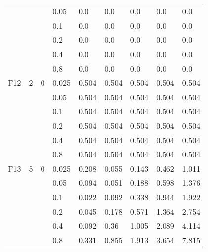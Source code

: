 \begin{longtable}{|l|l|l|l|l|l|l|l|l|}
\cmidrule{4-9} &     &          & 0.05           & 0.0        & 0.0        & 0.0        & 0.0        & 0.0        \\
\cmidrule{4-9} &     &          & 0.1            & 0.0        & 0.0        & 0.0        & 0.0        & 0.0        \\
\cmidrule{4-9} &     &          & 0.2            & 0.0        & 0.0        & 0.0        & 0.0        & 0.0        \\
\cmidrule{4-9} &     &          & 0.4            & 0.0        & 0.0        & 0.0        & 0.0        & 0.0        \\
\cmidrule{4-9} &     &          & 0.8            & 0.0        & 0.0        & 0.0        & 0.0        & 0.0        \\ \midrule
F12            & 2   & 0        & 0.025          & 0.504      & 0.504      & 0.504      & 0.504      & 0.504      \\
\cmidrule{4-9} &     &          & 0.05           & 0.504      & 0.504      & 0.504      & 0.504      & 0.504      \\
\cmidrule{4-9} &     &          & 0.1            & 0.504      & 0.504      & 0.504      & 0.504      & 0.504      \\
\cmidrule{4-9} &     &          & 0.2            & 0.504      & 0.504      & 0.504      & 0.504      & 0.504      \\
\cmidrule{4-9} &     &          & 0.4            & 0.504      & 0.504      & 0.504      & 0.504      & 0.504      \\
\cmidrule{4-9} &     &          & 0.8            & 0.504      & 0.504      & 0.504      & 0.504      & 0.504      \\ \midrule
F13            & 5   & 0        & 0.025          & 0.208      & 0.055      & 0.143      & 0.462      & 1.011      \\
\cmidrule{4-9} &     &          & 0.05           & 0.094      & 0.051      & 0.188      & 0.598      & 1.376      \\
\cmidrule{4-9} &     &          & 0.1            & 0.022      & 0.092      & 0.338      & 0.944      & 1.922      \\
\cmidrule{4-9} &     &          & 0.2            & 0.045      & 0.178      & 0.571      & 1.364      & 2.754      \\
\cmidrule{4-9} &     &          & 0.4            & 0.092      & 0.36       & 1.005      & 2.089      & 4.114      \\
\cmidrule{4-9} &     &          & 0.8            & 0.331      & 0.855      & 1.913      & 3.654      & 7.815      \\

\end{longtable}
